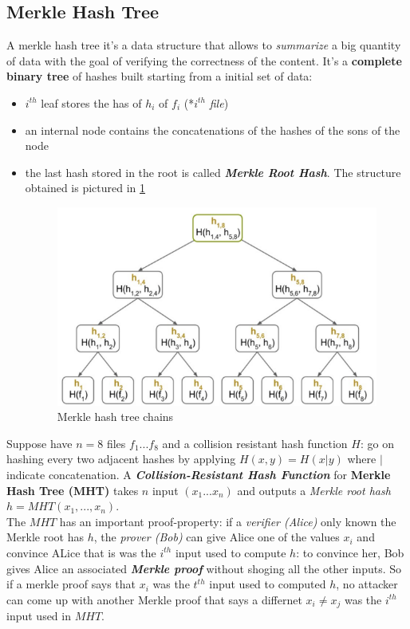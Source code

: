 \documentclass[10pt,a4paper]{report}
\begin{document}
\subsection{Merkle Hash Tree}\label{sec:3-merkle-hash-tree}
A merkle hash tree it's a data structure that allows to \textit{summarize} a big quantity of data with the goal of verifying the correctness of the content. It's a \textbf{complete binary tree} of hashes built starting from a initial set of data:
\begin{itemize}
	\item 
	$i^{th}$ leaf stores the has of $h_{i}$ of $f_{i}$ (*$i^{th}$ \textit{file})
	\item 
	an internal node contains the concatenations of the hashes of the sons of the node
	\item 
	the last hash stored in the root is called \textit{\textbf{Merkle Root Hash}}. The structure obtained is pictured in \ref{merkle-root-tree}
	\begin{figure}
		\centering
		\includegraphics[scale=0.50]{images/Pasted image 20230317164834.png}
		\caption{Merkle hash tree chains}
		\label{merkle-root-tree}	
\end{figure}
	

\end{itemize}

Suppose have $n=8$ files $f_{1}...f_{8}$ and a collision resistant hash function $H$: go on hashing every two adjacent hashes by applying $H(x,y) = H(x|y)$  where $|$ indicate concatenation.
A \textit{\textbf{Collision-Resistant Hash Function}} for \textbf{Merkle Hash Tree (MHT)} takes $n$ input $(x_{1}...x_{n})$ and outputs a \textit{Merkle root hash} $h = MHT(x_{1},...,x_{n})$.\\
The $MHT$ has an important proof-property: if a \textit{verifier (Alice)} only known the Merkle root has $h$, the \textit{prover (Bob)} can give Alice one of the values $x_{i}$ and convince ALice that is was the $i^{th}$ input used to compute $h$: to convince her, Bob gives Alice an associated \textit{\textbf{Merkle proof}} without shoging all the other inputs. So if a merkle proof says that $x_{i}$ was the $t^{th}$ input used to computed $h$, no attacker can come up with another Merkle proof that says a differnet $x_{i} \neq x_{j}$ was the $i^{th}$ input used in $MHT$.
\end{document}
